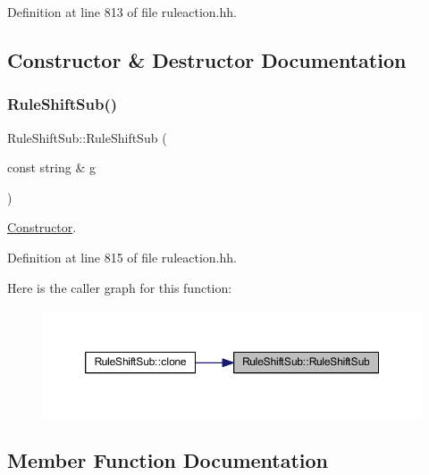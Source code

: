 Definition at line 813 of file ruleaction.\+hh.



\subsection{Constructor \& Destructor Documentation}
\mbox{\label{class_rule_shift_sub_af132ca6505dcd8b032e7d999ae0bd398}} 
\subsubsection{\texorpdfstring{RuleShiftSub()}{RuleShiftSub()}}
{\footnotesize\ttfamily Rule\+Shift\+Sub\+::\+Rule\+Shift\+Sub (\begin{DoxyParamCaption}\item[{const string \&}]{g }\end{DoxyParamCaption})\hspace{0.3cm}{\ttfamily [inline]}}



\mbox{\hyperlink{class_constructor}{Constructor}}. 



Definition at line 815 of file ruleaction.\+hh.

Here is the caller graph for this function\+:
\nopagebreak
\begin{figure}[H]
\begin{center}
\leavevmode
\includegraphics[width=350pt]{class_rule_shift_sub_af132ca6505dcd8b032e7d999ae0bd398_icgraph}
\end{center}
\end{figure}


\subsection{Member Function Documentation}
\mbox{\label{class_rule_shift_sub_aea3b654c2ff4472bdb597f16d660df9c}} 
